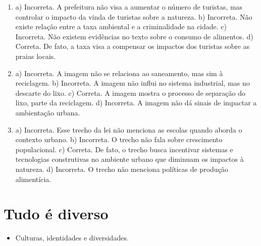 \begin{enumerate}

\item
a) Incorreta. A prefeitura não visa a aumentar o número de turistas, mas
controlar o impacto da vinda de turistas sobre a natureza.
b) Incorreta. Não existe relação entre a taxa ambiental e a
criminalidade na cidade.
c) Incorreta. Não existem evidências no texto sobre o consumo de
alimentos.
d) Correta. De fato, a taxa visa a compensar os impactos dos turistas
sobre as praias locais.

\item
a) Incorreta. A imagem não se relaciona ao saneamento, mas sim à
reciclagem.
b) Incorreta. A imagem não influi no sistema industrial, mas no descarte
do lixo.
c) Correta. A imagem mostra o processo de separação do lixo, parte da
reciclagem.
d) Incorreta. A imagem não dá sinais de impactar a ambientação urbana.

\item
a) Incorreta. Esse trecho da lei não menciona as escolas quando aborda o
contexto urbano.
b) Incorreta. O trecho não fala sobre crescimento populacional.
c) Correta. De fato, o trecho busca incentivar sistemas e tecnologias
construtivas no ambiente urbano que diminuam os impactos à natureza.
d) Incorreta. O trecho não menciona políticas de produção alimentícia.
\end{enumerate}

\chapter{Tudo é diverso}



\begin{itemize}
\item Culturas, identidades e diversidades.
\end{itemize}


